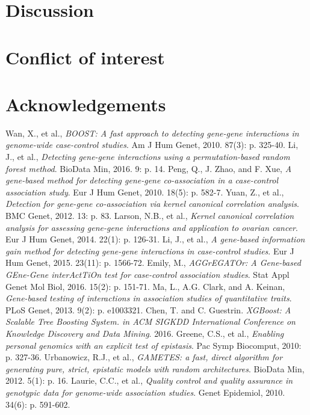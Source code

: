 \documentclass[11pt]{article}
\theoremstyle{plain}
\theoremstyle{definition}
\theoremstyle{remark}
\begin{document}
\section{Discussion}

\section{Conflict of interest}

\section{Acknowledgements}

\begin{thebibliography}{9}
Wan, X., et al., {\em BOOST: A fast approach to detecting gene-gene interactions in genome-wide case-control studies}. Am J Hum Genet, 2010. 87(3): p. 325-40.
Li, J., et al., {\em Detecting gene-gene interactions using a permutation-based random forest method}. BioData Min, 2016. 9: p. 14.
Peng, Q., J. Zhao, and F. Xue, {\em A gene-based method for detecting gene-gene co-association in a case-control association study}. Eur J Hum Genet, 2010. 18(5): p. 582-7.
Yuan, Z., et al., {\em Detection for gene-gene co-association via kernel canonical correlation analysis}. BMC Genet, 2012. 13: p. 83.
Larson, N.B., et al., {\em Kernel canonical correlation analysis for assessing gene-gene interactions and application to ovarian cancer}. Eur J Hum Genet, 2014. 22(1): p. 126-31.
Li, J., et al., {\em A gene-based information gain method for detecting gene-gene interactions in case-control studies}. Eur J Hum Genet, 2015. 23(11): p. 1566-72.
Emily, M., {\em AGGrEGATOr: A Gene-based GEne-Gene interActTiOn test for case-control association studies}. Stat Appl Genet Mol Biol, 2016. 15(2): p. 151-71.
Ma, L., A.G. Clark, and A. Keinan, {\em Gene-based testing of interactions in association studies of quantitative traits}. PLoS Genet, 2013. 9(2): p. e1003321.
Chen, T. and C. Guestrin. {\em XGBoost: A Scalable Tree Boosting System. in ACM SIGKDD International Conference on Knowledge Discovery and Data Mining}. 2016.
Greene, C.S., et al., {\em Enabling personal genomics with an explicit test of epistasis}. Pac Symp Biocomput, 2010: p. 327-36.
Urbanowicz, R.J., et al., {\em GAMETES: a fast, direct algorithm for generating pure, strict, epistatic models with random architectures}. BioData Min, 2012. 5(1): p. 16.
Laurie, C.C., et al., {\em Quality control and quality assurance in genotypic data for genome-wide association studies}. Genet Epidemiol, 2010. 34(6): p. 591-602.

\end{thebibliography}
\end{document}
